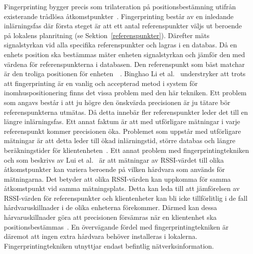 \documentclass[a4paper,12pt]{article}
\begin{document}
 Fingerprinting bygger precis som trilateration på positionsbestämning utifrån existerande trådlösa åtkomstpunkter~\cite{jun2018low}. Fingerprinting består av en inledande inlärningsfas där första steget är att ett antal referenspunkter väljs ut beroende på lokalens planritning (se Sektion~\ref{referenspunkter}). Därefter mäts signalstyrkan vid alla specifika referenspunkter och lagras i en databas.
 Då en enhets position ska bestämmas mäter enheten signalstyrkan och jämför den med värdena för referenspunkterna i databasen. Den referenspunkt som bäst matchar är den troliga positionen för enheten~\cite{IP1}~\cite{jun2018low}.
 Binghao Li et al.~\cite{IP1} understryker att trots att fingerprinting är en vanlig och accepterad metod i system för inomhuspositionering finns det vissa problem med den här tekniken.
 Ett problem som angavs består i att ju högre den önskvärda precisionen är ju tätare bör referenspunkterna utmätas. Då detta innebär fler referenspunkter leder det till en längre inlärningsfas. Ett annat faktum är att med utförligare mätningar i varje referenspunkt kommer precisionen öka. Problemet som uppstår med utförligare mätningar är att detta leder till ökad inlärningstid, större databas och längre beräkningstider för klientenheten~\cite{IP1}. Ett annat problem med fingerprintingtekniken och som beskrivs av Lui et al.~\cite{problem_with_RSSI} är att mätningar av RSSI-värdet till olika åtkomstpunkter kan variera beroende på vilken hårdvara som används för mätningarna. Det betyder att olika RSSI-värden kan uppkomma för samma åtkomstpunkt vid samma mätningsplats. Detta kan leda till att jämförelsen av RSSI-värden för referenspunkter och klientenheter kan bli icke tillförlitlig i de fall hårdvaruskillnader i de olika enheterna förekommer. Därmed kan dessa hårvaruskillnader göra att precisionen försämras när en klientenhet ska positionsbestämmas~\cite{problem_with_RSSI}. En övervägande fördel med fingerprintingtekniken är däremot att ingen extra hårdvara behöver installeras i lokalerna. Fingerprintingtekniken utnyttjar endast befintlig nätverksinformation.
\end{document}
